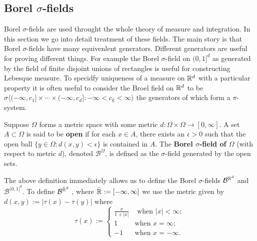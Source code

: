 





\subsection{Borel $\sigma$-fields}
Borel $\sigma$-fields are used throught the whole theory of measure and integration. In this section we go into detail treatment of these fields. The main story is that Borel $\sigma$-fields have many equivenlent generators. Different generators are useful for proving different things. For example the Borel $\sigma$-field on $(0,1]^d$ as generated by the field of finite disjoint unions of rectangles is useful for constructing Lebesque measure. To specidfy uniqueness of a measure on $\Bbb R^d$ with a particular property it is often useful to consider the Broel field on $\Bbb R^d$ to be $\sigma\bigl\langle (-\infty,c_1]\times \cdots \times (-\infty, c_d]: -\infty < c_k< \infty \bigr\rangle$ the generators of which form a $\pi$-system.


\begin{definition}
Suppose $\Omega$ forms a metric space with some metric $d:\Omega\times\Omega\rightarrow [0,\infty]$. A set $A\subset \Omega$ is said to be {\bf open} if for each $x\in A$, there exists an $\epsilon>0$ such that the {open ball} $\{y\in\Omega: d(x,y)<\epsilon \}$ is contained in $A$. The {\bf Borel $\sigma$-field of $\Omega$} (with respect to metric $d$), denoted $\mathcal B^\Omega$, is defined as the $\sigma$-field generated by the open sets.
\end{definition}

The above definition immediately allows us to define the Borel $\sigma$-fields  $\mathcal B^{\Bbb R^d}$ and $\mathcal B^{(0,1]^d}$. To define $\mathcal B^{\bar{\Bbb R}^d}$ , where $\bar{\Bbb R}:=[-\infty, \infty]$ we use the metric given by $d(x,y):= |\tau(x) - \tau(y)|$ where
\begin{equation}
\label{eq: generate extended metric}
\tau(x):=\begin{cases} \frac{x}{1+|x|} &\text{ when $|x|<\infty$};\\
 1 &\text{when $x=\infty$};\\
  -1&\text{when $x=-\infty$}.
 \end{cases}
 \end{equation}



